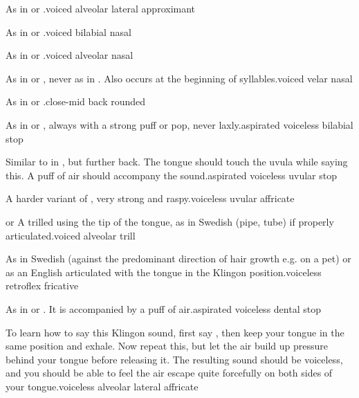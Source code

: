 %
  {\textipa{[l]} As in  or .}{voiced
  alveolar lateral approximant}

%
  {\textipa{[m]} As in  or .}{voiced
  bilabial nasal}

%
  {\textipa{[n]} As in  or .}{voiced
  alveolar nasal}

%
  {\textipa{[N]} As in  or , never as in
  . Also occurs at the beginning of syllables.}{voiced
  velar nasal}

%
  {\textipa{[o]} As in  or .}{close-mid back
  rounded}

%
  {\textipa{[p\super h]} As in  or ,
  always with a strong puff or pop, never laxly.}{aspirated voiceless
  bilabial stop}

%
  {\textipa{[q\super h]} Similar to  in , but further
  back. The tongue should touch the uvula while saying this. A puff of
  air should accompany the sound.}{aspirated voiceless uvular stop}

%
  {\textipa{[\t{qX}]} A harder variant of , very strong and
  raspy.}{voiceless uvular affricate}

%
  {\textipa{[r]} or \textipa{[\*r]} A trilled  using the tip of
  the tongue, as in Swedish  (pipe, tube) if properly
  articulated.}{voiced alveolar trill}


%
  {\textipa{[\:s]} As in Swedish  (against the
  predominant direction of hair growth e.g. on a pet) or as an English
   articulated with the tongue in the Klingon 
  position.}{voiceless retroflex fricative}

%
  {\textipa{[t\super h]} As in  or
  . It is accompanied by a puff of air.}{aspirated
  voiceless dental stop}

%
  {\textipa{[\t{t\textbeltl}]} To learn how to say this Klingon sound,
  first say , then keep your tongue in the same position and
  exhale. Now repeat this, but let the air build up pressure behind
  your tongue before releasing it. The resulting sound should be
  voiceless, and you should be able to feel the air escape quite
  forcefully on both sides of your tongue.}{voiceless alveolar
  lateral affricate}

